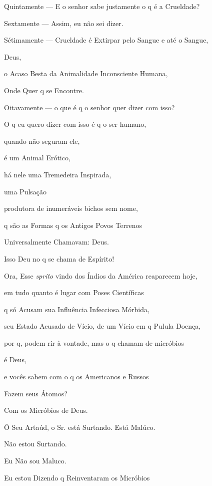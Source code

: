 
Quintamente --- E o senhor sabe justamente o q é a Crueldade?


Sextamente --- Assim, eu não sei dizer.

Sétimamente --- Crueldade é Extirpar pelo Sangue e até o Sangue,

Deus,

o Acaso Besta da Animalidade Inconsciente Humana, 

Onde Quer q se Encontre.


Oitavamente --- o que é q o senhor quer dizer com isso?


O q eu quero dizer com isso é q o ser humano,

quando não seguram ele,

é um Animal Erótico,

há nele uma Tremedeira Inspirada,

uma Pulsação

produtora de inumeráveis bichos sem nome,

q são as Formas q os Antigos Povos Terrenos 

Universalmente Chamavam: Deus.

Isso Deu no q se chama de Espírito!

Ora, Esse \emph{sprito} vindo dos Índios da América reaparecem hoje,

em tudo quanto é lugar com Poses Científicas

q só Acusam sua Influência Infecciosa Mórbida,

seu Estado Acusado de Vício, de um Vício em q Pulula Doença,

por q, podem rir à vontade, mas o q chamam de micróbios

é Deus, 

e vocês sabem com o q os Americanos e Russos

Fazem seus Átomos?

Com os Micróbios de Deus.


Ô Seu Artaúd, o Sr. está Surtando. Está Malúco.


Não estou Surtando.

Eu Não sou Maluco.

Eu estou Dizendo q Reinventaram os Micróbios

